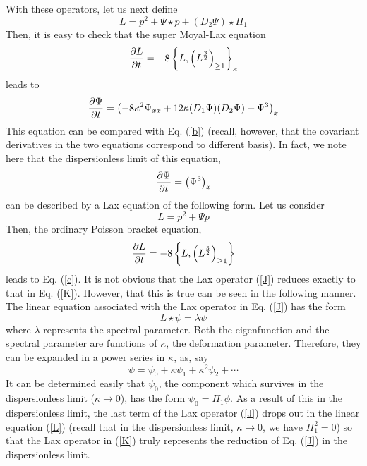 \documentclass[a4paper,11pt]{article}
\begin{document}
With these operators, let us next define
\begin{equation}
L = p^{2} + \Psi\star p + (D_{2}\Psi)\star \Pi_{1}\label{J}
\end{equation}
Then, it is easy to check that the super Moyal-Lax equation
\begin{equation}
{\partial L\over \partial t} = -8 \left\{L, \left(L^{3\over
2}\right)_{\geq 1}\right\}_{\kappa}
\end{equation}
leads to
\begin{equation}
{\partial \Psi\over \partial t} = \left(-8\kappa^{2} \Psi_{xx} +
12\kappa (D_{1}\Psi)(D_{2}\Psi) + \Psi^{3}\right)_{x}
\end{equation}
This equation can be compared with Eq. (\ref{b}) (recall, however,
that the covariant derivatives in the two equations correspond to
different basis). In fact, we note
here that the dispersionless limit of this equation, 
\begin{equation}
{\partial \Psi\over \partial t} = \left(\Psi^{3}\right)_{x}\label{c}
\end{equation}
can be described by a Lax equation of the following form. Let us
consider
\begin{equation}
L = p^{2} + \Psi p\label{K}
\end{equation}
Then, the ordinary Poisson bracket equation,
\begin{equation}
{\partial L\over \partial t} = -8 \left\{L, \left(L^{3\over
2}\right)_{\geq 1}\right\}
\end{equation}
leads to Eq. (\ref{c}). It is not obvious that the Lax operator
(\ref{J}) reduces exactly to that in Eq. (\ref{K}). However, that this
is true can be seen in the following manner. The linear equation
associated with the Lax operator in Eq. (\ref{J}) has the form
\begin{equation}
L\star \psi = \lambda \psi\label{L}
\end{equation}
where $\lambda$ represents the spectral parameter. Both the
eigenfunction and the spectral parameter are functions of $\kappa$,
the deformation parameter. Therefore, they can be expanded in a power
series in $\kappa$, as, say
\begin{equation}
\psi = \psi_{0} + \kappa \psi_{1} + \kappa^{2} \psi_{2} +\cdots
\end{equation}
It can be determined easily that $\psi_{0}$, the component which survives in
the dispersionless limit ($\kappa\rightarrow 0$), has the form
$\psi_{0}=\Pi_{1} \phi$. As a result of this in the dispersionless
limit, the last term of the Lax operator (\ref{J}) drops out in the
linear equation (\ref{L}) (recall that in the dispersionless limit,
$\kappa\rightarrow 0$, we have $\Pi_{1}^{2}=0$) so that the Lax operator
in (\ref{K}) truly represents the reduction of Eq. (\ref{J}) in the
dispersionless limit.
\end{document}
